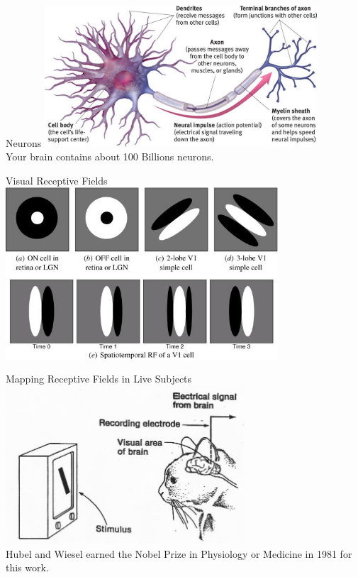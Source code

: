 \documentclass[serif,xcolor=pdftex,dvipsnames,table,hyperref={bookmarks=false}]{beamer}
\begin{document}
\begin{frame}[t]{Neurons}
\center
\includegraphics[width=4in]{../Figures/neuron.jpg}\\
\pause Your brain contains about 100 Billions neurons. 
\end{frame}

\begin{frame}[t]{Visual Receptive Fields}
\center
\includegraphics[width=4in]{../Figures/receptive_fields.jpg}\\ 
\end{frame}

\begin{frame}[t]{Mapping Receptive Fields in Live Subjects}
\center
\includegraphics[width=3.5in]{../Figures/cat_experiment.jpg}\\ 
Hubel and Wiesel earned the Nobel Prize in Physiology or Medicine in 1981 for this work.\\
\end{frame}
\end{document}
